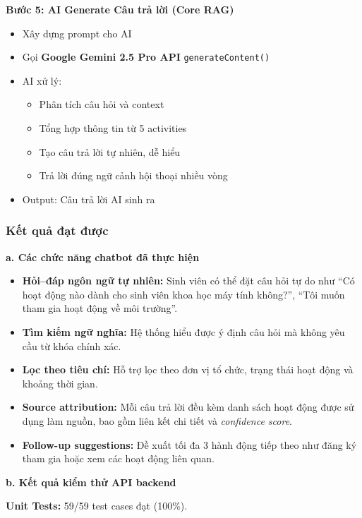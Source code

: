 \textbf{Bước 5: AI Generate Câu trả lời (Core RAG)}
\begin{itemize}
    \item Xây dựng prompt cho AI
    \item Gọi \textbf{Google Gemini 2.5 Pro API} \texttt{generateContent()}
    \item AI xử lý:
    \begin{itemize}
        \item Phân tích câu hỏi và context
        \item Tổng hợp thông tin từ 5 activities
        \item Tạo câu trả lời tự nhiên, dễ hiểu
        \item Trả lời đúng ngữ cảnh hội thoại nhiều vòng
    \end{itemize}
    \item Output: Câu trả lời AI sinh ra
\end{itemize}

\subsubsection{Kết quả đạt được}
\textbf{a. Các chức năng chatbot đã thực hiện}
\begin{itemize}
    \item \textbf{Hỏi--đáp ngôn ngữ tự nhiên:} Sinh viên có thể đặt câu hỏi tự do như ``Có hoạt động nào dành cho sinh viên khoa học máy tính không?'', ``Tôi muốn tham gia hoạt động về môi trường''.
    \item \textbf{Tìm kiếm ngữ nghĩa:} Hệ thống hiểu được ý định câu hỏi mà không yêu cầu từ khóa chính xác.
    \item \textbf{Lọc theo tiêu chí:} Hỗ trợ lọc theo đơn vị tổ chức, trạng thái hoạt động và khoảng thời gian.
    \item \textbf{Source attribution:} Mỗi câu trả lời đều kèm danh sách hoạt động được sử dụng làm nguồn, bao gồm liên kết chi tiết và \textit{confidence score}.
    \item \textbf{Follow-up suggestions:} Đề xuất tối đa 3 hành động tiếp theo như đăng ký tham gia hoặc xem các hoạt động liên quan.
\end{itemize}

\vspace{0.5em}
\textbf{b. Kết quả kiểm thử API backend}

\textbf{Unit Tests:} 59/59 test cases đạt (100\%).

